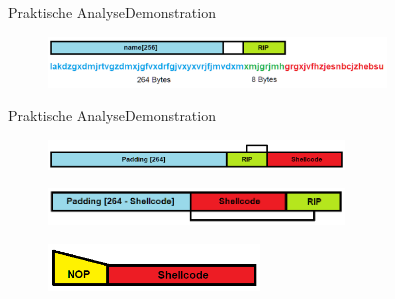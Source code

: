 \begin{frame}{Praktische Analyse}{Demonstration}
    \begin{figure}[h]
        \centering
        \includegraphics[width=0.8\textwidth,height=0.75\textheight,keepaspectratio]{images/characters.png}
    \end{figure}
\end{frame}

\begin{frame}{Praktische Analyse}{Demonstration}
    \begin{figure}[h]
        \centering
        \includegraphics[width=0.7\textwidth,height=0.75\textheight,keepaspectratio]{images/payload1.png}
    \end{figure}
    \begin{figure}[h]
        \centering
        \includegraphics[width=0.7\textwidth,height=0.75\textheight,keepaspectratio]{images/payload2.png}
    \end{figure}
    \begin{figure}[h]
        \centering
        \includegraphics[width=0.5\textwidth,height=0.75\textheight,keepaspectratio]{images/nop.png}
    \end{figure}
\end{frame}

